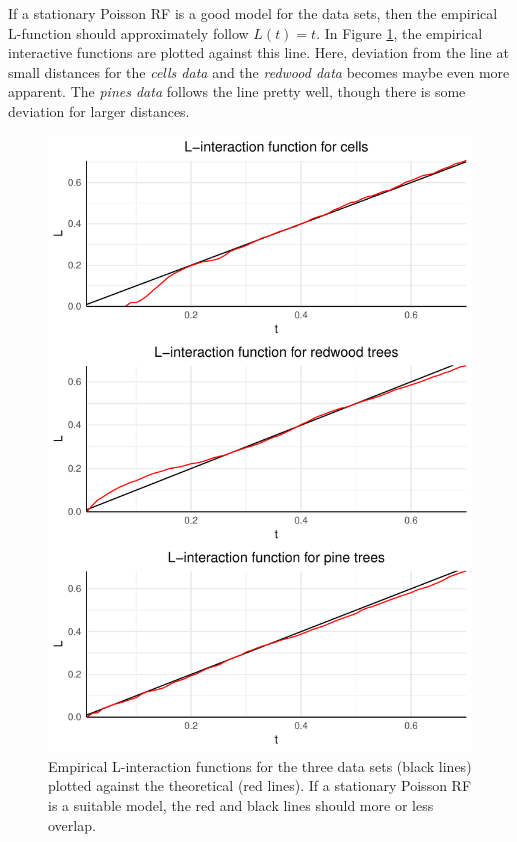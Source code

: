 If a stationary Poisson RF is a good model for the data sets, then the empirical L-function should approximately follow $L(t) = t$. In Figure \ref{fig:L_emp_theor}, the empirical interactive functions are plotted against this line. Here, deviation from the line at small distances for the \textit{cells data} and the \textit{redwood data} becomes maybe even more apparent. The \textit{pines data} follows the line pretty well, though there is some deviation for larger distances. 

\begin{figure}
    \centering
    \includegraphics[scale=0.95]{figures/prob1_L_emp_theor.pdf}
    \caption{Empirical L-interaction functions for the three data sets (black lines) plotted against the theoretical (red lines). If a stationary Poisson RF is a suitable model, the red and black lines should more or less overlap.}
    \label{fig:L_emp_theor}
\end{figure}

